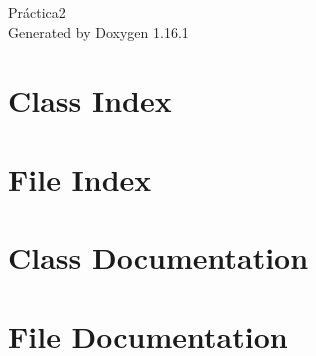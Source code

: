 \documentclass[twoside]{book}
\newcommand{\+}{\discretionary{\mbox{\scriptsize$\hookleftarrow$}}{}{}}
\newcommand{\clearemptydoublepage}{%
    \newpage{\pagestyle{empty}\cleardoublepage}%
  }
\begin{document}
  \raggedbottom
    \hypersetup{pageanchor=false,
                bookmarksnumbered=true,
                pdfencoding=unicode
               }
  \begin{titlepage}
  \vspace*{7cm}
  \begin{center}%
  {\Large Práctica2}\\
  \vspace*{1cm}
  {\large Generated by Doxygen 1.16.1}\\
  \end{center}
  \end{titlepage}
  \clearemptydoublepage
  \tableofcontents
  \clearemptydoublepage
  \hypersetup{pageanchor=true}
\chapter{Class Index}

\chapter{File Index}

\chapter{Class Documentation}








\chapter{File Documentation}









  \backmatter
  \newpage
  \clearemptydoublepage
  \printindex
\end{document}
